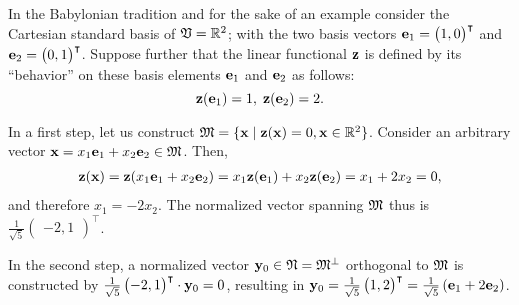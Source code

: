 {\color{blue}
\bexample
In the Babylonian
tradition
and for the sake of an example
consider the Cartesian standard basis of ${\frak V} = \mathbb{R}^2$;
with the two basis vectors
${\bf e}_1 =\begin{pmatrix} 1,0\end{pmatrix}^\intercal $ and
${\bf e}_2 =\begin{pmatrix} 0,1\end{pmatrix}^\intercal $.
Suppose further that the linear functional ${\bf z}$ is defined by its ``behavior'' on these basis elements
${\bf e}_1$  and
${\bf e}_2$ as follows:
\begin{equation}
 {\bf z}({\bf e}_1) = 1 ,
\; {\bf z}({\bf e}_2) = 2.
\end{equation}

In a first step, let us construct
${\frak M}=\{ {\bf x} \mid {\bf z}({\bf x}) = 0, {\bf x} \in  \mathbb{R}^2\}$.
Consider an arbitrary vector ${\bf x} = x_1 {\bf e}_1 + x_2 {\bf e}_2 \in {\frak M}$.
Then,
\begin{equation}
\begin{split}
{\bf z}  ( {\bf x} )
=  {\bf z}  ( x_1 {\bf e}_1 + x_2 {\bf e}_2 )
=  x_1 {\bf z}  ( {\bf e}_1) + x_2 {\bf z}  ( {\bf e}_2 )
=  x_1  + 2 x_2 = 0
,
\end{split}
\end{equation}
and therefore $x_1 =  - 2 x_2 $.
The normalized vector spanning ${\frak M}$ thus is
$\frac{1}{\sqrt{5}} \begin{pmatrix} -2,1\end{pmatrix}^\intercal $.

In the second step, a normalized vector  ${\bf y}_0 \in  {\frak N} = {\frak M}^\perp$ orthogonal to ${\frak M}$ is constructed by
$\frac{1}{\sqrt{5}} \begin{pmatrix} -2,1\end{pmatrix}^\intercal  \cdot {\bf y}_0=0$,
resulting in
${\bf y}_0=\frac{1}{\sqrt{5}} \begin{pmatrix} 1,2\end{pmatrix}^\intercal  =
\frac{1}{\sqrt{5}} \left( {\bf e}_1 +2 {\bf e}_2 \right) $.

}
